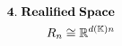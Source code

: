 \documentclass[preview]{standalone}
\begin{document}
\begin{align*}
\special{dvisvgm:raw <g id='unique000'>}\mathbf{4.\;Realified\;Space}\\R_n\cong\mathbb{R}^{d(\mathbb{K})n}\special{dvisvgm:raw </g>}
\end{align*}
\end{document}
